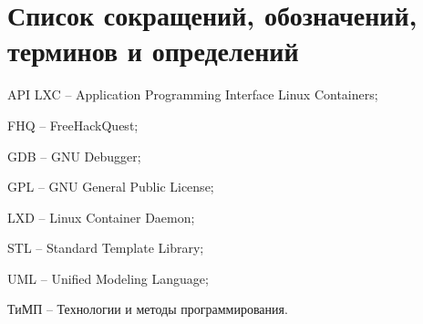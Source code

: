 \section*{Список сокращений, обозначений, терминов и определений}

API LXC -- Application Programming Interface Linux Containers;\par
FHQ -- FreeHackQuest;\par
GDB -- GNU Debugger;\par
GPL -- GNU General Public License;\par
LXD -- Linux Container Daemon;\par
STL -- Standard Template Library;\par
UML -- Unified Modeling Language;\par
ТиМП -- Технологии и методы программирования.\par
\clearpage